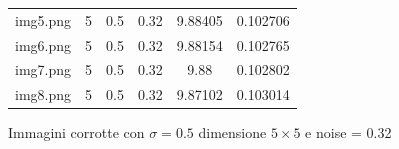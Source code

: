 \begin{figure}[H]
\begin{minipage}[h]{0.55\textwidth}
{\begin{tabular}{|l c c c c r|}
                img5.png & 5 & 0.5 & 0.32 & 9.88405 & 0.102706 \\ 
                img6.png & 5 & 0.5 & 0.32 & 9.88154 & 0.102765 \\
                img7.png & 5 & 0.5 & 0.32 & 9.88 & 0.102802 \\              
                img8.png & 5 & 0.5 & 0.32 & 9.87102 & 0.103014 \\  \hline
            \end{tabular}\label{tab:tabcorrotte5}  
}     
        \end{minipage}%
    \begin{minipage}[h]{0.4\textwidth}
        \centering
    \end{minipage}
    \captionsetup{labelformat=andtable}
    \caption{Immagini corrotte con $\sigma = 0.5$ dimensione $5 \times 5$ e noise = 0.32}
\end{figure}

